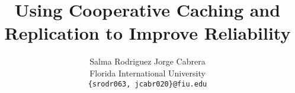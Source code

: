 \documentclass[letterpaper,twocolumn,10pt]{article}
\title{\Large \bf Using Cooperative Caching and Replication to Improve Reliability}
\author{
  {\rm Salma Rodriguez}
  \qquad
  {\rm Jorge Cabrera}
  \\
  Florida International University
  \\
  {\rm \texttt{\{srodr063, jcabr020\}@fiu.edu}}
  \\
}
\date{}
\begin{document}
\maketitle








{
  \footnotesize
  
  
}
\end{document}

